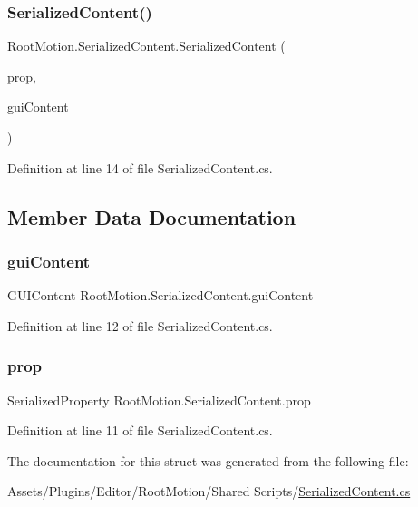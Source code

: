 \subsubsection{\texorpdfstring{Serialized\+Content()}{SerializedContent()}}
{\footnotesize\ttfamily Root\+Motion.\+Serialized\+Content.\+Serialized\+Content (\begin{DoxyParamCaption}\item[{Serialized\+Property}]{prop,  }\item[{G\+U\+I\+Content}]{gui\+Content }\end{DoxyParamCaption})}



Definition at line 14 of file Serialized\+Content.\+cs.



\subsection{Member Data Documentation}
\mbox{\label{struct_root_motion_1_1_serialized_content_a545a76e14eca41d225310d8104de1b66}} 
\subsubsection{\texorpdfstring{gui\+Content}{guiContent}}
{\footnotesize\ttfamily G\+U\+I\+Content Root\+Motion.\+Serialized\+Content.\+gui\+Content}



Definition at line 12 of file Serialized\+Content.\+cs.

\mbox{\label{struct_root_motion_1_1_serialized_content_a855f20bd650050d318b9b3b325ec46a3}} 
\subsubsection{\texorpdfstring{prop}{prop}}
{\footnotesize\ttfamily Serialized\+Property Root\+Motion.\+Serialized\+Content.\+prop}



Definition at line 11 of file Serialized\+Content.\+cs.



The documentation for this struct was generated from the following file\+:\begin{DoxyCompactItemize}
\item 
Assets/\+Plugins/\+Editor/\+Root\+Motion/\+Shared Scripts/\mbox{\hyperlink{_serialized_content_8cs}{Serialized\+Content.\+cs}}\end{DoxyCompactItemize}
